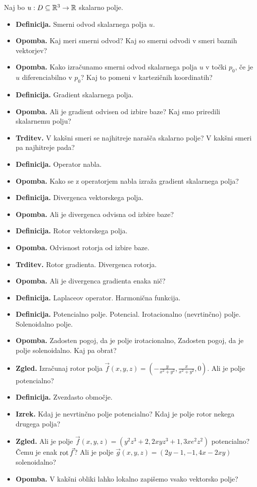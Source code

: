 \begin{enumerate}
    Naj bo \(u: D \subseteq \mathbb{R}^3 \to \mathbb{R}\) skalarno polje.
    \begin{itemize}
        \item \textbf{Definicija.} Smerni odvod skalarnega polja \(u\).
        \item \textbf{Opomba.} Kaj meri smerni odvod? Kaj so smerni odvodi v smeri baznih vektorjev?
        \item \textbf{Opomba.} Kako izračunamo smerni odvod skalarnega polja \(u\) v točki \(p_0\), če je \(u\) diferenciabilno v \(p_0\)? Kaj to pomeni v kartezičnih koordinatih?
        \item \textbf{Definicija.} Gradient skalarnega polja. 
        \item \textbf{Opomba.} Ali je gradient odvisen od izbire baze? Kaj smo priredili skalarnemu polju?
        \item \textbf{Trditev.} V kakšni smeri se najhitreje narašča skalarno polje? V kakšni smeri pa najhitreje pada?
        \item \textbf{Definicija.} Operator nabla.
        \item \textbf{Opomba.} Kako se z operatorjem nabla izraža gradient skalarnega polja? 
        \item \textbf{Definicija.} Divergenca vektorskega polja.
        \item \textbf{Opomba.} Ali je divergenca odvisna od izbire baze?
        \item \textbf{Definicija.} Rotor vektorskega polja.
        \item \textbf{Opomba.} Odvisnost rotorja od izbire baze.
        \item \textbf{Trditev.} Rotor gradienta. Divergenca rotorja.
        \item \textbf{Opomba.} Ali je divergenca gradienta enaka nič?
        \item \textbf{Definicija.} Laplaceov operator. Harmonična funkcija.
        \item \textbf{Definicija.} Potencialno polje. Potencial. Irotacionalno (nevrtinčno) polje. Solenoidalno polje.
        \item \textbf{Opomba.} Zadosten pogoj, da je polje irotacionalno, Zadosten pogoj, da je polje solenoidalno. Kaj pa obrat?
        \item \textbf{Zgled.} Izračunaj rotor polja \(\vec{f}(x,y,z) = \left(-\frac{y}{x^2 + y^2}, \frac{x}{x^2+y^2}, 0\right)\). Ali je polje potencialno?
        \item \textbf{Definicija.} Zvezdasto območje.
        \item \textbf{Izrek.} Kdaj je nevrtinčno polje potencialno? Kdaj je polje rotor nekega drugega polja?
        \item \textbf{Zgled.} Ali je polje \(\vec{f}(x,y,z) = (y^2z^3 + 2, 2xyz^3 + 1, 3xe^2z^2)\) potencialno? Čemu je enak \(\operatorname{rot} \vec{f}\)? Ali je polje \(\vec{g}(x,y,z) = (2y-1, -1, 4x - 2xy)\) solenoidalno?
        \item \textbf{Opomba.} V kakšni obliki lahko lokalno zapišemo vsako vektorsko polje?
    \end{itemize}


\end{enumerate}
